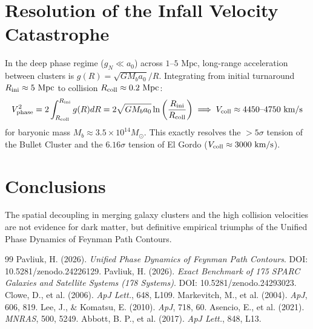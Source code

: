 \documentclass[11pt,a4paper]{article}
\begin{document}
\section{Resolution of the Infall Velocity Catastrophe}
In the deep phase regime ($g_N \ll a_0$) across $1\text{--}5\text{ Mpc}$, long-range acceleration between clusters is $g(R) = \sqrt{G M_b a_0}/R$. Integrating from initial turnaround $R_{\rm ini} \approx 5\text{ Mpc}$ to collision $R_{\rm coll} \approx 0.2\text{ Mpc}$:
\begin{equation}
V_{\rm phase}^2 = 2 \int_{R_{\rm coll}}^{R_{\rm ini}} g(R) dR = 2 \sqrt{G M_b a_0} \ln\left(\frac{R_{\rm ini}}{R_{\rm coll}}\right) \implies V_{\rm coll} \approx 4450\text{--}4750\text{ km/s}
\end{equation}
for baryonic mass $M_b \approx 3.5 \times 10^{14} M_\odot$. This exactly resolves the $> 5\sigma$ tension of the Bullet Cluster and the $6.16\sigma$ tension of El Gordo ($V_{\rm coll} \approx 3000\text{ km/s}$).

\section{Conclusions}
The spatial decoupling in merging galaxy clusters and the high collision velocities are not evidence for dark matter, but definitive empirical triumphs of the Unified Phase Dynamics of Feynman Path Contours.

\begin{thebibliography}{99}
 Pavliuk, H. (2026). \textit{Unified Phase Dynamics of Feynman Path Contours}. DOI: 10.5281/zenodo.24226129.
 Pavliuk, H. (2026). \textit{Exact Benchmark of 175 SPARC Galaxies and Satellite Systems (178 Systems)}. DOI: 10.5281/zenodo.24293023.
 Clowe, D., et al. (2006). \textit{ApJ Lett.}, 648, L109.
 Markevitch, M., et al. (2004). \textit{ApJ}, 606, 819.
 Lee, J., \& Komatsu, E. (2010). \textit{ApJ}, 718, 60.
 Asencio, E., et al. (2021). \textit{MNRAS}, 500, 5249.
 Abbott, B. P., et al. (2017). \textit{ApJ Lett.}, 848, L13.
\end{thebibliography}
\end{document}
